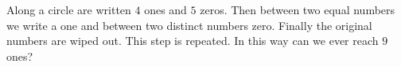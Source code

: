 Along a circle are written $4$ ones and $5$ zeros. Then between two equal numbers we write a one and between two distinct numbers zero. Finally the original numbers are wiped out. This step is repeated. In this way can we ever reach $9$ ones?
